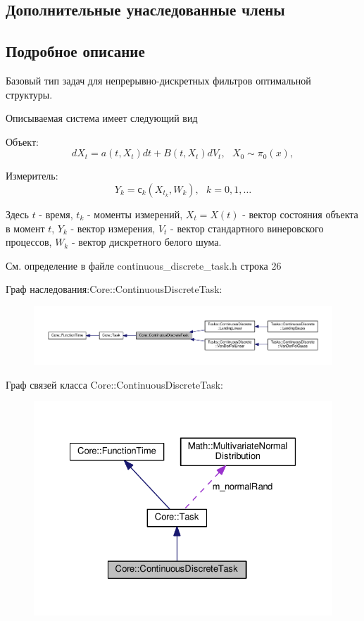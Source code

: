 \subsection*{Дополнительные унаследованные члены}


\subsection{Подробное описание}
Базовый тип задач для непрерывно-\/дискретных фильтров оптимальной структуры. 

Описываемая система имеет следующий вид


\begin{DoxyItemize}
\item Объект\+: \[dX_t = a(t, X_t)dt + B(t, X_t)dV_t,\ \ \ X_0 \sim \pi_0(x),\]
\item Измеритель\+: \[Y_k = с_k(X_{t_k}, W_k),\ \ \ k = 0, 1, \ldots\]
\end{DoxyItemize}

Здесь $t$ -\/ время, $t_k$ -\/ моменты измерений, $X_t = X(t)$ -\/ вектор состояния объекта в момент $t$, $Y_k$ -\/ вектор измерения, $V_t$ -\/ вектор стандартного винеровского процессов, $W_k$ -\/ вектор дискретного белого шума. 

См. определение в файле continuous\+\_\+discrete\+\_\+task.\+h строка 26



Граф наследования\+:Core\+:\+:Continuous\+Discrete\+Task\+:
\nopagebreak
\begin{figure}[H]
\begin{center}
\leavevmode
\includegraphics[width=350pt]{class_core_1_1_continuous_discrete_task__inherit__graph}
\end{center}
\end{figure}


Граф связей класса Core\+:\+:Continuous\+Discrete\+Task\+:
\nopagebreak
\begin{figure}[H]
\begin{center}
\leavevmode
\includegraphics[width=328pt]{class_core_1_1_continuous_discrete_task__coll__graph}
\end{center}
\end{figure}


